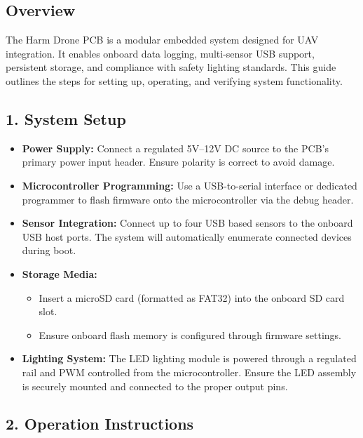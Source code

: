 \documentclass[12pt]{article}
\begin{document}
\subsection*{Overview}
\par The Harm Drone PCB is a modular embedded system designed for UAV integration. It enables onboard data logging, multi-sensor USB support, persistent storage, and compliance with safety lighting standards. This guide outlines the steps for setting up, operating, and verifying system functionality.

\subsection*{1. System Setup}

\begin{itemize}
    \item \textbf{Power Supply:} Connect a regulated 5V–12V DC source to the PCB's primary power input header. Ensure polarity is correct to avoid damage.
    \item \textbf{Microcontroller Programming:} Use a USB-to-serial interface or dedicated programmer to flash firmware onto the microcontroller via the debug header.
    \item \textbf{Sensor Integration:} Connect up to four USB based sensors to the onboard USB host ports. The system will automatically enumerate connected devices during boot.
    \item \textbf{Storage Media:}
    \begin{itemize}
        \item Insert a microSD card (formatted as FAT32) into the onboard SD card slot.
        \item Ensure onboard flash memory is configured through firmware settings.
    \end{itemize}
    \item \textbf{Lighting System:} The LED lighting module is powered through a regulated rail and PWM controlled from the microcontroller. Ensure the LED assembly is securely mounted and connected to the proper output pins.
\end{itemize}

\subsection*{2. Operation Instructions}
\end{document}
